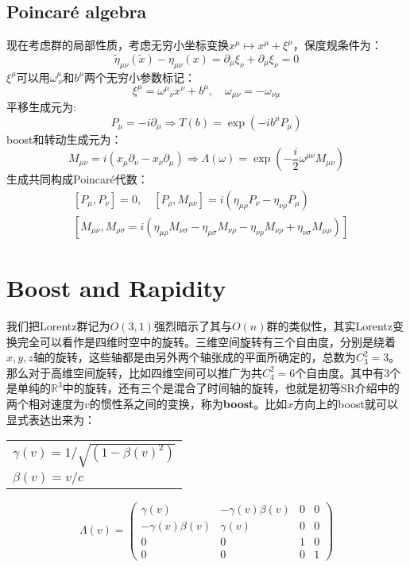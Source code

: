 \subsection{Poincar\'e algebra}
现在考虑群的局部性质，考虑无穷小坐标变换$x^\mu\mapsto x^\mu+\xi^\mu$，保度规条件为：
\begin{equation}
	\tilde{\eta}_{\mu\nu}(\tilde x)-\eta_{\mu\nu}(x)=\partial_\mu\xi_\nu+\partial_\mu\xi_\nu=0
\end{equation}
$\xi^\mu$可以用$\omega_{\ \nu}^\mu$和$b^\mu$两个无穷小参数标记：
\[\xi^\mu={\omega^\mu}_\nu x^\nu+b^\mu,\quad \omega_{\mu\nu}=-\omega_{\nu\mu}\]
平移生成元为:
\[P_\mu=-i\partial_\mu\Rightarrow T(b)=\exp(-i b^\mu P_\mu)\]
boost和转动生成元为：
\[M_{\mu\nu}=i\left(x_\mu\partial_\nu-x_\nu\partial_\mu\right)\Rightarrow \Lambda(\omega)=\exp(-\frac{i}{2} \omega^{\mu\nu} M_{\mu\nu})\]
生成共同构成Poincar\'e代数：
\begin{equation}
	\boxed{
	\begin{aligned}
		&[P_\mu,P_\nu]=0,\quad[P_\rho,M_{\mu\nu}]=i(\eta_{\mu\rho}P_\nu-\eta_{\nu\rho} P_\mu)\\
		&[M_{\mu\nu},M_{\rho\sigma}=i\left(\eta_{\mu\rho}M_{\nu\sigma}-\eta_{\mu\sigma}M_{\nu\rho}-\eta_{\nu\rho}M_{\nu\rho}+\eta_{\nu\sigma}M_{\mu\rho}\right)]
	\end{aligned}
}
\end{equation}

\section{Boost and Rapidity}
我们把Lorentz群记为$O(3,1)$强烈暗示了其与$O(n)$群的类似性，其实Lorentz变换完全可以看作是四维时空中的旋转。三维空间旋转有三个自由度，分别是绕着$x,y,z$轴的旋转，这些轴都是由另外两个轴张成的平面所确定的，总数为$C_3^2=3$。那么对于高维空间旋转，比如四维空间可以推广为共$C_4^2=6$个自由度。其中有3个是单纯的$\mathbb{R}^3$中的旋转，还有三个是混合了时间轴的旋转，也就是初等SR介绍中的两个相对速度为$v$的惯性系之间的变换，称为\textbf{boost}。比如$x$方向上的boost就可以显式表达出来为：
\begin{margintable}\footnotesize 
	\begin{tabularx}{\marginparwidth}{|X}
		$\gamma(v)=1/\sqrt{(1-\beta(v)^2)}$\\
		$\beta(v)=v/c$
	\end{tabularx}
\end{margintable}
\begin{equation}
	\Lambda(v)=\begin{pmatrix}
		\gamma(v)&-\gamma(v)\beta(v)  &0  & 0\\
		-\gamma(v)\beta(v) & \gamma(v) &0  &0 \\
		0&0  & 1 &0 \\
		0&  0&  0&1
	\end{pmatrix}
\end{equation}

